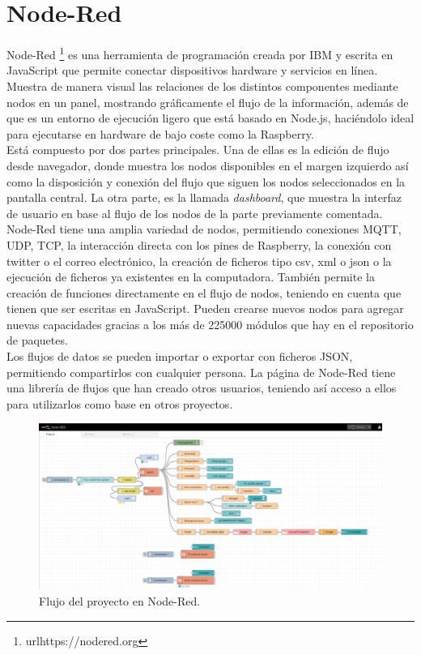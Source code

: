 \section{Node-Red}
\label{sec:nodered}
Node-Red \footnote{url{https://nodered.org}} es una herramienta de programación creada por IBM y escrita en JavaScript que permite conectar dispositivos hardware y servicios en línea. Muestra de manera visual las relaciones de los distintos componentes mediante nodos en un panel, mostrando gráficamente el flujo de la información, además de que es un entorno de ejecución ligero que está basado en Node.js, haciéndolo ideal para ejecutarse en hardware de bajo coste como la Raspberry.\\
Está compuesto por dos partes principales. Una de ellas es la edición de flujo desde navegador, donde muestra los nodos disponibles en el margen izquierdo así como la disposición y conexión del flujo que siguen los nodos seleccionados en la pantalla central. La otra parte, es la llamada \textit{dashboard}, que muestra la interfaz de usuario en base al flujo de los nodos de la parte previamente comentada.\\
Node-Red tiene una amplia variedad de nodos, permitiendo conexiones MQTT, UDP, TCP, la interacción directa con los pines de Raspberry, la conexión con twitter o el correo electrónico, la creación de ficheros tipo csv, xml o json o la ejecución de ficheros ya existentes en la computadora. También permite la creación de funciones directamente en el flujo de nodos, teniendo en cuenta que tienen que ser escritas en JavaScript. Pueden crearse nuevos nodos para agregar nuevas capacidades gracias a los más de 225000 módulos que hay en el repositorio de paquetes.\\
Los flujos de datos se pueden importar o exportar con ficheros JSON, permitiendo compartirlos con cualquier persona. La página de Node-Red tiene una librería de flujos que han creado otros usuarios, teniendo así acceso a ellos para utilizarlos como base en otros proyectos.\\
\begin{figure} [h!]
  \begin{center}
    \includegraphics[width=15cm]{figs/flujo}
  \end{center}
  \caption{Flujo del proyecto en Node-Red.}
  \label{fig:flow}
\end{figure}
